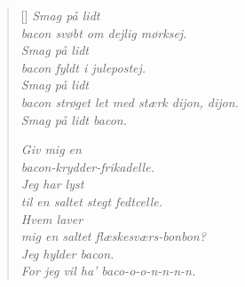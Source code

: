 \begin{multicols}
\begin{verse}[\versewidth]
\emph{Smag på lidt\\
bacon svøbt om dejlig mørksej.\\
Smag på lidt\\
bacon fyldt i julepostej.\\
Smag på lidt\\
bacon strøget let med stærk dijon, dijon.\\
Smag på lidt bacon.}

\emph{Giv mig en\\
bacon-krydder-frikadelle.\\
Jeg har lyst\\
til en saltet stegt fedtcelle.\\
Hvem laver\\
mig en saltet flæskesværs-bonbon?\\
Jeg hylder bacon.\\
For jeg vil ha’ baco-o-o-n-n-n-n.}
\end{verse}
\end{multicols}

\newpage

